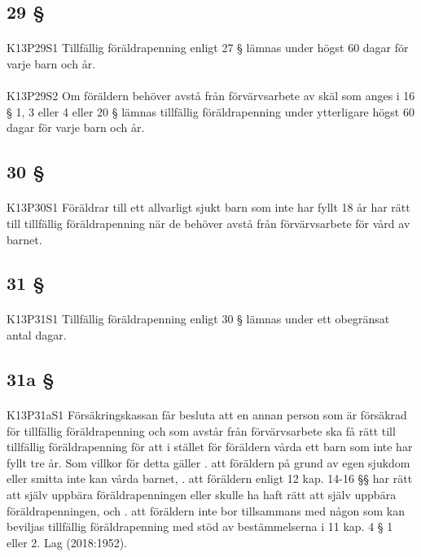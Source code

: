 \documentclass[a4paper,notitlepage,openany,10pt]{book}
\begin{document}
\subsection*{29 §}
\paragraph*{}
{\tiny K13P29S1}
Tillfällig föräldrapenning enligt 27 § lämnas under högst 60 dagar för varje barn och år.
\paragraph*{}
{\tiny K13P29S2}
Om föräldern behöver avstå från förvärvsarbete av skäl som anges i 16 § 1, 3 eller 4 eller 20 § lämnas tillfällig föräldrapenning under ytterligare högst 60 dagar för varje barn och år.
\subsection*{30 §}
\paragraph*{}
{\tiny K13P30S1}
Föräldrar till ett allvarligt sjukt barn som inte har fyllt 18 år har rätt till tillfällig föräldrapenning när de behöver avstå från förvärvsarbete för vård av barnet.
\subsection*{31 §}
\paragraph*{}
{\tiny K13P31S1}
Tillfällig föräldrapenning enligt 30 § lämnas under ett obegränsat antal dagar.
\subsection*{31a §}
\paragraph*{}
{\tiny K13P31aS1}
Försäkringskassan får besluta att en annan person som är försäkrad för tillfällig föräldrapenning och som avstår från förvärvsarbete ska få rätt till tillfällig föräldrapenning för att i stället för föräldern vårda ett barn som inte har fyllt tre år. Som villkor för detta gäller
. att föräldern på grund av egen sjukdom eller smitta inte kan vårda barnet,
. att föräldern enligt 12 kap. 14-16 §§ har rätt att själv uppbära föräldrapenningen eller skulle ha haft rätt att själv uppbära föräldrapenningen, och
. att föräldern inte bor tillsammans med någon som kan beviljas tillfällig föräldrapenning med stöd av bestämmelserna i 11 kap. 4 § 1 eller 2.
Lag (2018:1952).
\end{document}
